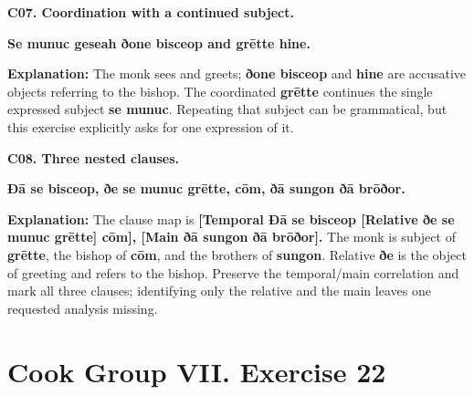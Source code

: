 \par\begin{minipage}{\linewidth}\raggedright
\textbf{C07. Coordination with a continued subject.}

\textbf{Se munuc geseah ðone bisceop and grētte hine.}

\textbf{Explanation:} The monk sees and greets; \textbf{ðone bisceop} and \textbf{hine} are accusative objects referring to the bishop. The coordinated \textbf{grētte} continues the single expressed subject \textbf{se munuc}. Repeating that subject can be grammatical, but this exercise explicitly asks for one expression of it.

\end{minipage}\par\addvspace{4pt}

\par\begin{minipage}{\linewidth}\raggedright
\textbf{C08. Three nested clauses.}

\textbf{Ðā se bisceop, ðe se munuc grētte, cōm, ðā sungon ðā brōðor.}

\textbf{Explanation:} The clause map is \textbf{[Temporal Ðā se bisceop [Relative ðe se munuc grētte] cōm], [Main ðā sungon ðā brōðor].} The monk is subject of \textbf{grētte}, the bishop of \textbf{cōm}, and the brothers of \textbf{sungon}. Relative \textbf{ðe} is the object of greeting and refers to the bishop. Preserve the temporal/\allowbreak{}main correlation and mark all three clauses; identifying only the relative and the main leaves one requested analysis missing.

\end{minipage}\par\addvspace{4pt}

\section*{Cook Group VII. Exercise 22}

